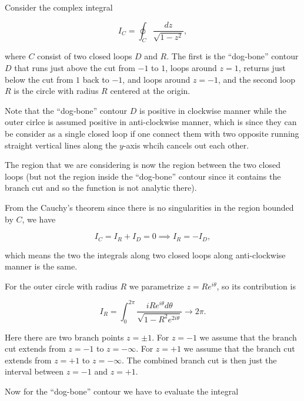 \documentclass[english,a4paper,12pt]{report}
\begin{document}
{Consider the complex integral

\begin{equation}
  I_{C} = \oint_{C} \frac{dz}{\sqrt{1-z^2} },
\end{equation}

where \(C\) consist of two closed loops \(D\) and \(R\). The first is the “dog‐bone” contour \(D\) that runs just above the cut from \(-1\) to \(1\), loops around \(z=1\), returns just below the cut from \(1\) back to \(-1\), and loops around \(z=-1\), and the second loop \(R\) is the circle with radius \(R\) centered at the origin.

Note that the “dog‐bone” contour \(D\) is positive in clockwise manner while the outer cirlce is assumed positive in anti-clockwise manner, which is since they can be consider as a single closed loop if one connect them with two opposite running straight vertical lines along the \(y\)-axis whcih cancels out each other. 

The region that we are considering is now the region between the two closed loops (but not the region inside the “dog‐bone” contour since it contains the branch cut and so the function is not analytic there).

From the Cauchy's theorem since there is no singularities in the region bounded by \(C\), we have 

\begin{equation}
    I_{C} = I_{R} + I_{D} = 0 \implies I_{R} = -I_{D},
\end{equation}

which means the two the integrals along two closed loops along anti-clockwise manner is the same.

For the outer circle with radius \(R\) we parametrize \(z = Re^{i \theta } \), so its contribution is 

\begin{equation}
    I_{R} = \int_{0}^{2\pi } \frac{i Re^{i \theta } d \theta }{\sqrt{1- R^2e^{2i \theta } } } \to 2\pi. 
\end{equation}

Here there are two branch points \(z = \pm 1\). For \(z = -1\) we assume that the branch cut extends from \(z = -1\) to \(z = -\infty\). For \(z = +1\) we assume that the branch cut extends from \(z= + 1\) to \(z = -\infty\). The combined branch cut is then just the interval between \(z = -1\) and \(z = +1\).

Now for the ``dog-bone'' contour we have to evaluate the integral

}
\end{document}
